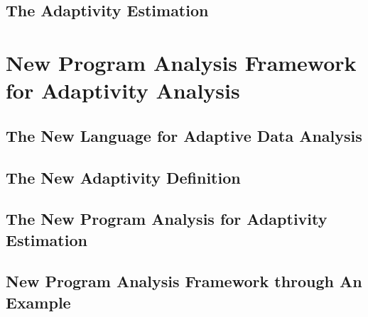 \documentclass[a4paper,11pt]{article}
\begin{document}
\subsection{The Adaptivity Estimation}
\label{sec:prework-static}


\section{New Program Analysis Framework for Adaptivity Analysis}
\label{sec:adapt-analysis}
% 

\subsection{The New Language for Adaptive Data Analysis}
\label{sec:adapt-language}



\subsection{The New Adaptivity Definition}
\label{sec:adapt-exe}

% 

\subsection{The New Program Analysis for Adaptivity Estimation}
\label{sec:adapt-static}


\subsection{New Program Analysis Framework through An Example}
\label{sec:adapt-example}

\end{document}
